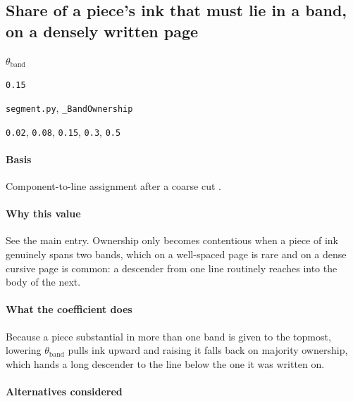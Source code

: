 \subsection{Share of a piece's ink that must lie in a band, on a densely written page}

\label{coef:band-ink-share-dense}

\begin{description}[leftmargin=5.2em,style=sameline]

\item[Symbol] $\theta_{\text{band}}$

\item[Value] \texttt{0.15}

\item[Source] \texttt{segment.py}, \texttt{\_BandOwnership}

\item[Swept] \texttt{0.02}, \texttt{0.08}, \texttt{0.15}, \texttt{0.3}, \texttt{0.5}

\end{description}

\paragraph{Basis}

Component-to-line assignment after a coarse cut \cite{likforman2007}.

\paragraph{Why this value}

See the main entry. Ownership only becomes contentious when a piece of ink genuinely spans two bands, which on a well-spaced page is rare and on a dense cursive page is common: a descender from one line routinely reaches into the body of the next.

\paragraph{What the coefficient does}

Because a piece substantial in more than one band is given to the topmost, lowering $\theta_{\text{band}}$ pulls ink upward and raising it falls back on majority ownership, which hands a long descender to the line below the one it was written on.

\paragraph{Alternatives considered}

